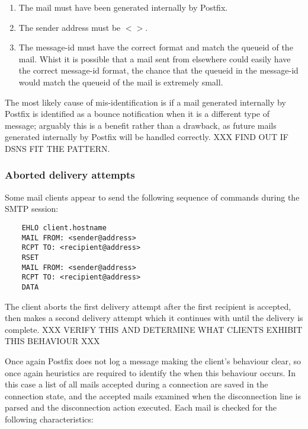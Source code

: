\documentclass[a4paper,12pt,draft]{article}
\begin{document}
\begin{enumerate}

    \item The mail must have been generated internally by Postfix.

    \item The sender address must be $<>$.

    \item The message-id must have the correct format and match the queueid
        of the mail.  Whist it is possible that a mail sent from elsewhere
        could easily have the correct message-id format, the chance that
        the queueid in the message-id would match the queueid of the mail
        is extremely small.

\end{enumerate}

The most likely cause of mis-identification is if a mail generated
internally by Postfix is identified as a bounce notification when it is a
different type of message; arguably this is a benefit rather than a
drawback, as future mails generated internally by Postfix will be handled
correctly.  XXX FIND OUT IF DSNS FIT THE PATTERN.

\subsubsection{Aborted delivery attempts}

\label{aborted-delivery-attempts}

Some mail clients appear to send the following sequence of commands during
the SMTP session:

\begin{verbatim}
    EHLO client.hostname
    MAIL FROM: <sender@address>
    RCPT TO: <recipient@address>
    RSET
    MAIL FROM: <sender@address>
    RCPT TO: <recipient@address>
    DATA
\end{verbatim}

The client aborts the first delivery attempt after the first recipient is
accepted, then makes a second delivery attempt which it continues with
until the delivery is complete. XXX VERIFY THIS AND DETERMINE WHAT CLIENTS
EXHIBIT THIS BEHAVIOUR XXX

Once again Postfix does not log a message making the client's behaviour
clear, so once again heuristics are required to identify the when this
behaviour occurs.  In this case a list of all mails accepted during a
connection are saved in the connection state, and the accepted mails
examined when the disconnection line is parsed and the disconnection action
executed.  Each mail is checked for the following characteristics:
\end{document}

